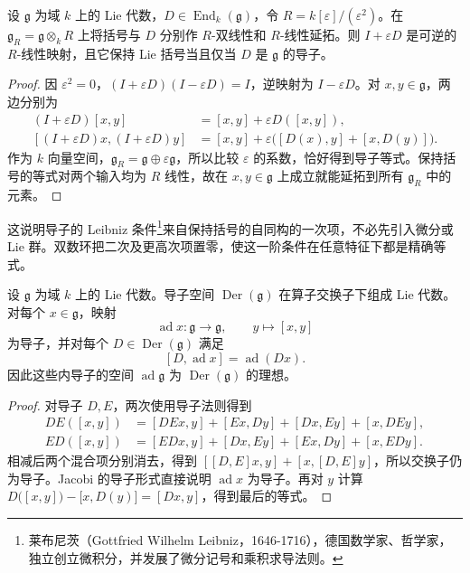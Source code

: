 \begin{proposition}\label{b5:prop:lie-derivation-first-order}
	设 \(\mathfrak g\) 为域 \(k\) 上的 Lie 代数，\(D\in\operatorname{End}_k(\mathfrak g)\)，令 \(R=k[\varepsilon]/(\varepsilon^2)\)。在 \(\mathfrak g_R=\mathfrak g\otimes_kR\) 上将括号与 \(D\) 分别作 \(R\)-双线性和 \(R\)-线性延拓。则 \(I+\varepsilon D\) 是可逆的 \(R\)-线性映射，且它保持 Lie 括号当且仅当 \(D\) 是 \(\mathfrak g\) 的导子。
\end{proposition}
\begin{proof}
	因 \(\varepsilon^2=0\)，\((I+\varepsilon D)(I-\varepsilon D)=I\)，逆映射为 \(I-\varepsilon D\)。对 \(x,y\in\mathfrak g\)，两边分别为
	\[
		\begin{aligned}
			(I+\varepsilon D)[x,y] &=[x,y]+\varepsilon D([x,y]),\\
			[(I+\varepsilon D)x,(I+\varepsilon D)y] &=[x,y]+\varepsilon\bigl([D(x),y]+[x,D(y)]\bigr).
		\end{aligned}
	\]
	作为 \(k\) 向量空间，\(\mathfrak g_R=\mathfrak g\oplus\varepsilon\mathfrak g\)，所以比较 \(\varepsilon\) 的系数，恰好得到导子等式。保持括号的等式对两个输入均为 \(R\) 线性，故在 \(x,y\in\mathfrak g\) 上成立就能延拓到所有 \(\mathfrak g_R\) 中的元素。
\end{proof}
这说明导子的 Leibniz 条件\footnote{莱布尼茨（Gottfried Wilhelm Leibniz，1646-1716），德国数学家、哲学家，独立创立微积分，并发展了微分记号和乘积求导法则。}来自保持括号的自同构的一次项，不必先引入微分或 Lie 群。双数环把二次及更高次项置零，使这一阶条件在任意特征下都是精确等式。
\begin{proposition}\label{b5:prop:lie-derivations}
	设 \(\mathfrak g\) 为域 \(k\) 上的 Lie 代数。导子空间 \(\operatorname{Der}(\mathfrak g)\) 在算子交换子下组成 Lie 代数。对每个 \(x\in\mathfrak g\)，映射
	\[
		\operatorname{ad}x:\mathfrak g\longrightarrow\mathfrak g,\qquad y\longmapsto[x,y]
	\]
	为导子，并对每个 \(D\in\operatorname{Der}(\mathfrak g)\) 满足
	\[
		[D,\operatorname{ad}x]=\operatorname{ad}(D x).
	\]
	因此这些内导子的空间 \(\operatorname{ad}\mathfrak g\) 为 \(\operatorname{Der}(\mathfrak g)\) 的理想。
\end{proposition}
\begin{proof}
	对导子 \(D,E\)，两次使用导子法则得到
	\[
		\begin{aligned}
			DE([x,y])&=[DEx,y]+[Ex,Dy]+[Dx,Ey]+[x,DEy],\\
			ED([x,y])&=[EDx,y]+[Dx,Ey]+[Ex,Dy]+[x,EDy].
		\end{aligned}
	\]
	相减后两个混合项分别消去，得到 \([[D,E]x,y]+[x,[D,E]y]\)，所以交换子仍为导子。Jacobi 的导子形式直接说明 \(\operatorname{ad}x\) 为导子。再对 \(y\) 计算 \(D\bigl([x,y]\bigr)-\bigl[x,D(y)\bigr]=[Dx,y]\)，得到最后的等式。
\end{proof}
